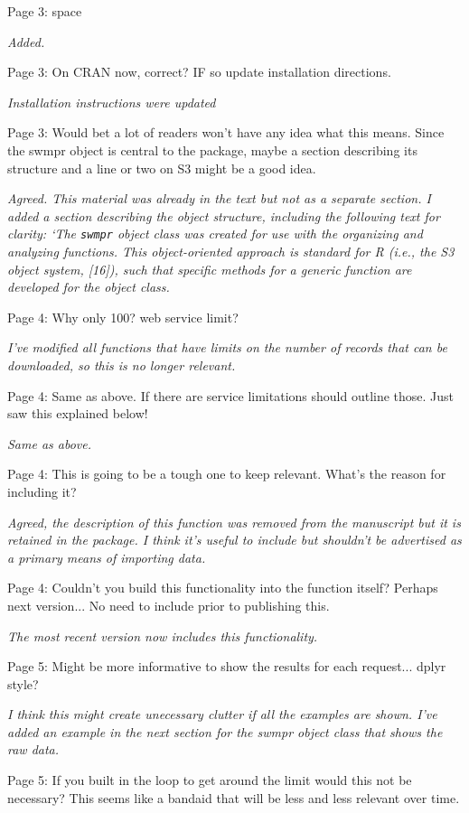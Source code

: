 \documentclass[letterpaper,12pt]{article}\usepackage[]{graphicx}\usepackage[]{color}
\begin{document}
Page 3: space

{\it Added.}

Page 3: On CRAN now, correct? IF so update installation directions.

{\it Installation instructions were updated}
 
Page 3: Would bet a lot of readers won't have any idea what this means. Since the swmpr object is central to the package, maybe a section describing its structure and a line or two on S3 might be a good idea.

{\it Agreed.  This material was already in the text but not as a separate section.  I added a section describing the object structure, including the following text for clarity: `The \texttt{swmpr} object class was created for use with the organizing and analyzing functions.  This object-oriented approach is standard for R (i.e., the S3 object  system, [16]), such that specific methods for a generic function are developed for the object class.}  

Page 4: Why only 100? web service limit?

{\it I've modified all functions that have limits on the number of records that can be downloaded, so this is no longer relevant.}

Page 4: Same as above. If there are service limitations should outline those. Just saw this explained below!

{\it Same as above.}

Page 4: This is going to be a tough one to keep relevant. What's the reason for including it?

{\it Agreed, the description of this function was removed from the manuscript but it is retained in the package.  I think it's useful to include but shouldn't be advertised as a primary means of importing data.}

Page 4: Couldn't you build this functionality into the function itself? Perhaps next version... No need to include prior to publishing this.

{\it The most recent version now includes this functionality.}

Page 5: Might be more informative to show the results for each request... dplyr style?

{\it I think this might create unecessary clutter if all the examples are shown.  I've added an example in the next section for the swmpr object class that shows the raw data.}

Page 5: If you built in the loop to get around the limit would this not be necessary? This seems like a bandaid that will be less and less relevant over time.
\end{document}
